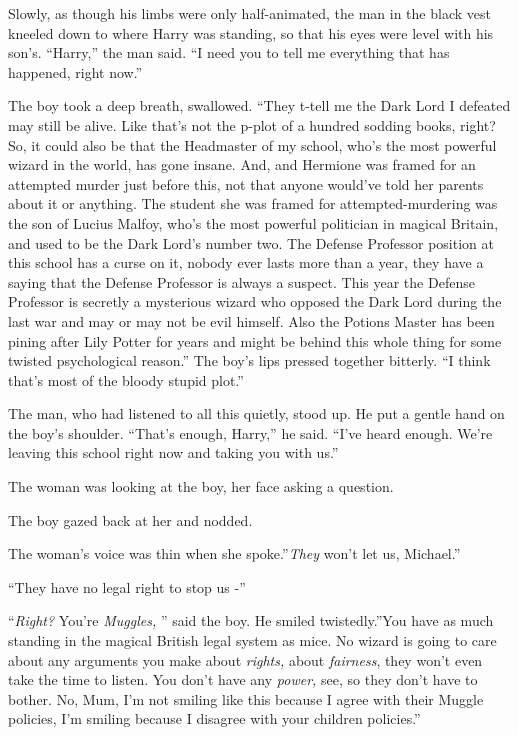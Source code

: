 Slowly, as though his limbs were only half-animated, the man in the
black vest kneeled down to where Harry was standing, so that his eyes
were level with his son's. ``Harry,'' the man said. ``I need you to tell
me everything that has happened, right now.''

The boy took a deep breath, swallowed. ``They t-tell me the Dark Lord I
defeated may still be alive. Like that's not the p-plot of a hundred
sodding books, right? So, it could also be that the Headmaster of my
school, who's the most powerful wizard in the world, has gone insane.
And, and Hermione was framed for an attempted murder just before this,
not that anyone would've told her parents about it or anything. The
student she was framed for attempted-murdering was the son of Lucius
Malfoy, who's the most powerful politician in magical Britain, and used
to be the Dark Lord's number two. The Defense Professor position at this
school has a curse on it, nobody ever lasts more than a year, they have
a saying that the Defense Professor is always a suspect. This year the
Defense Professor is secretly a mysterious wizard who opposed the Dark
Lord during the last war and may or may not be evil himself. Also the
Potions Master has been pining after Lily Potter for years and might be
behind this whole thing for some twisted psychological reason.'' The
boy's lips pressed together bitterly. ``I think that's most of the
bloody stupid plot.''

The man, who had listened to all this quietly, stood up. He put a gentle
hand on the boy's shoulder. ``That's enough, Harry,'' he said. ``I've
heard enough. We're leaving this school right now and taking you with
us.''

The woman was looking at the boy, her face asking a question.

The boy gazed back at her and nodded.

The woman's voice was thin when she spoke.''\emph{They} won't let us,
Michael.''

``They have no legal right to stop us -''

``\emph{Right?} You're \emph{Muggles,} '' said the boy. He smiled
twistedly.''You have as much standing in the magical British legal
system as mice. No wizard is going to care about any arguments you make
about \emph{rights,} about \emph{fairness}, they won't even take the
time to listen. You don't have any \emph{power,} see, so they don't have
to bother. No, Mum, I'm not smiling like this because I agree with their
Muggle policies, I'm smiling because I disagree with your children
policies.''

